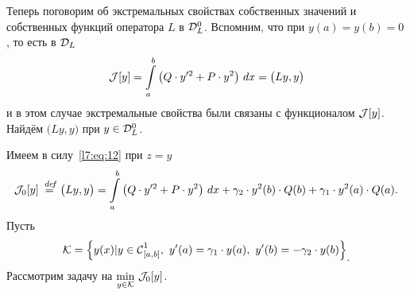 Теперь поговорим об экстремальных свойствах собственных значений и собственных функций оператора $L$ в $\mathcal{D}_L^0$. Вспомним, что при $y(a)=y(b)=0$, то есть в $\mathcal{D}_L$ 
\begin{equation*}
	\hfill\J[y]=\int\limits_a^b\left(Q\cdot y^{\prime2}+P\cdot y^2\right)\,dx=\big(Ly,y\big)\hfill
\end{equation*} 
и в этом случае экстремальные свойства были связаны с функционалом $\mathcal{J}[y]$. Найдём $\big(Ly,y\big)$ при $y\in\mathcal{D}_L^0$.

Имеем в силу~\eqref{l7:eq:12} при $z=y$
\begin{equation}
	\label{l7:eq:13}
	\hfill\J_0[y]\eqdef\big(Ly,y\big)=\int\limits_a^b\left(Q\cdot y^{\prime2}+P\cdot y^2\right)\,dx+\gamma_2\cdot y^2(b)\cdot Q(b)+\gamma_1\cdot y^2(a)\cdot Q(a).\hfill
\end{equation} 
Пусть
\begin{equation*}
	\hfill\K=\left\{y(x)|y\in\Cfn[{[a,b]}]{1},\ y'(a)=\gamma_1\cdot y(a),\ y'(b)=-\gamma_2\cdot y(b) \right\}_{\displaystyle.}\hfill
\end{equation*}
Рассмотрим задачу на $\displaystyle\min\limits_{y\in\mathcal{K}}\,\mathcal{J}_0[y]$. 

